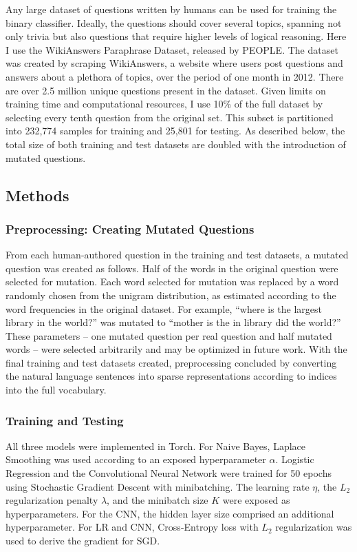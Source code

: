 Any large dataset of questions written by humans can be used for training the binary classifier. Ideally, the questions should cover several topics, spanning not only trivia but also questions that require higher levels of logical reasoning. Here I use the WikiAnswers Paraphrase Dataset, released by PEOPLE. The dataset was created by scraping WikiAnswers, a website where users post questions and answers about a plethora of topics, over the period of one month in 2012. There are over 2.5 million unique questions present in the dataset. Given limits on training time and computational resources, I use 10\% of the full dataset by selecting every tenth question from the original set. This subset is partitioned into 232,774 samples for training and 25,801 for testing. As described below, the total size of both training and test datasets are doubled with the introduction of mutated questions.

\subsection{Methods}

\subsubsection{Preprocessing: Creating Mutated Questions}

From each human-authored question in the training and test datasets, a mutated question was created as follows. Half of the words in the original question were selected for mutation. Each word selected for mutation was replaced by a word randomly chosen from the unigram distribution, as estimated according to the word frequencies in the original dataset. For example, ``where is the largest library in the world?'' was mutated to ``mother is the in library did the world?'' These parameters -- one mutated question per real question and half mutated words -- were selected arbitrarily and may be optimized in future work. With the final training and test datasets created, preprocessing concluded by converting the natural language sentences into sparse representations according to indices into the full vocabulary. 

\subsubsection{Training and Testing}

All three models were implemented in Torch. For Naive Bayes, Laplace Smoothing was used according to an exposed hyperparameter $\alpha$. Logistic Regression and the Convolutional Neural Network were trained for 50 epochs using Stochastic Gradient Descent with minibatching. The learning rate $\eta$, the $L_2$ regularization penalty $\lambda$, and the minibatch size $K$ were exposed as hyperparameters. For the CNN, the hidden layer size comprised an additional hyperparameter. For LR and CNN, Cross-Entropy loss with $L_2$ regularization was used to derive the gradient for SGD. 

